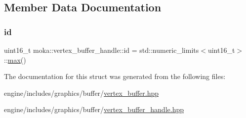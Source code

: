 \subsection{Member Data Documentation}
\mbox{\label{structmoka_1_1vertex__buffer__handle_ae6ce2ad9ec43d66727c59f9ecce6d4fb}} 
\subsubsection{\texorpdfstring{id}{id}}
{\footnotesize\ttfamily uint16\+\_\+t moka\+::vertex\+\_\+buffer\+\_\+handle\+::id = std\+::numeric\+\_\+limits$<$uint16\+\_\+t$>$\+::\mbox{\hyperlink{namespacemoka_acf03408f89c521244763fb5f8746ce16a2ffe4e77325d9a7152f7086ea7aa5114}{max}}()}



The documentation for this struct was generated from the following files\+:\begin{DoxyCompactItemize}
\item 
engine/includes/graphics/buffer/\mbox{\hyperlink{vertex__buffer_8hpp}{vertex\+\_\+buffer.\+hpp}}\item 
engine/includes/graphics/buffer/\mbox{\hyperlink{vertex__buffer__handle_8hpp}{vertex\+\_\+buffer\+\_\+handle.\+hpp}}\end{DoxyCompactItemize}
